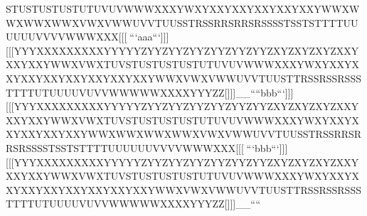 STUSTUSTUSTUTUVUVWWWXXXYWXYXXYXXYXXYXXYXXYWWXWWXWWXWWXVWXVWWUVVTUUSSTRSSRRSRRSRSSSSTSSTSTTTTUUUUUUVVVVWWWXXX[[[^^_```aaa```]]][[[YYYXXXXXXXXXYYYYYZYYZYYZYYZYYZYYZYYZXYZXYZXYZXXYXXYXXYWWXVWXTUVSTUSTUSTUSTUTUVUVWWWXXXYWXYXXYXXYXXYXXYXXYXXYXXYXXYWWXVWXVWWUVVTUUSTTRSSRSSRSSSTTTTUTUUUUVUVVWWWWWXXXXYYYZZ[]]]__````bbb```]]][[[YYYXXXXXXXXXYYYYYZYYZYYZYYZYYZYYZYYZXYZXYZXYZXXYXXYXXYWWXVWXTUVSTUSTUSTUSTUTUVUVWWWXXXYWXYXXYXXYXXYXXYXXYWWXWWXWWXWWXVWXVWWUVVTUUSSTRSSRRSRRSRSSSSTSSTSTTTTUUUUUUVVVVWWWXXX[[[^^_```bbb```]]][[[YYYXXXXXXXXXYYYYYZYYZYYZYYZYYZYYZYYZXYZXYZXYZXXYXXYXXYWWXVWXTUVSTUSTUSTUSTUTUVUVWWWXXXYWXYXXYXXYXXYXXYXXYXXYXXYXXYWWXVWXVWWUVVTUUSTTRSSRSSRSSSTTTTUTUUUUVUVVWWWWWXXXXYYYZZ[]]]__````